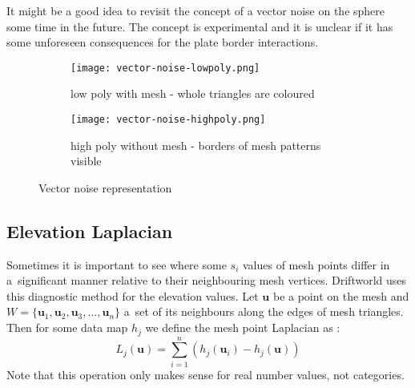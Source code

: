 It might be a good idea to revisit the concept of a vector noise on the sphere some time in the future. The concept is experimental and it is unclear if it has some unforeseen consequences for the plate border interactions.
\begin{figure}[ht]
\centering
\begin{subfigure}{7cm}
\texttt{[image: vector-noise-lowpoly.png]}
\caption{low poly with mesh - whole triangles are coloured}
\label{fig:vector-noise-lowpoly}
\end{subfigure}
\hspace*{1cm}
\begin{subfigure}{7cm}
\texttt{[image: vector-noise-highpoly.png]}
\caption{high poly without mesh - borders of mesh patterns visible}
\label{fig:vector-noise-highpoly}
\end{subfigure}
\caption{Vector noise representation}
\label{fig:vector-noise}
\end{figure}
\subsection{Elevation Laplacian}
Sometimes it is important to see where some $s_i$ values of mesh points differ in a~significant manner relative to their neighbouring mesh vertices. Driftworld uses this diagnostic method for the elevation values. Let $\mathbf{u}$ be a point on the mesh and $W=\{\mathbf{u}_1,\mathbf{u}_2,\mathbf{u}_3,...,\mathbf{u}_n\}$ a~set of its neighbours along the edges of mesh triangles. Then for some data map $h_j$ we define the mesh point Laplacian as \cite{diffoperators}:
$$L_j(\mathbf{u})=\sum_{i=1}^n\left(h_j(\mathbf{u}_i)-h_j(\mathbf{u})\right)$$
Note that this operation only makes sense for real number values, not categories.
